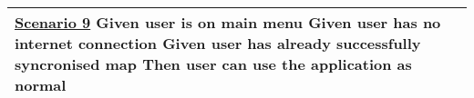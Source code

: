 \begin{longtable}{| p{} | p{}|}
	\newline\underline{Scenario 9}\newline
	Given user is on main menu \newline
	Given user has no internet connection\newline
	Given user has already successfully syncronised map \newline
	Then user can use the application as normal\newline
	&
	\\\hline
\end{longtable}
